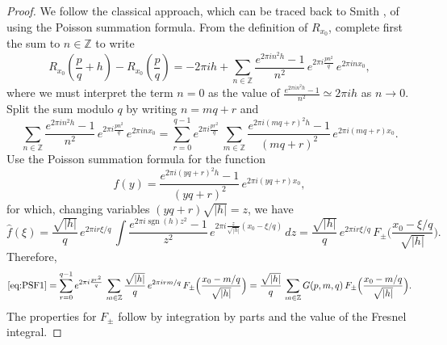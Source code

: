 \documentclass[11pt,reqno]{amsart}
\theoremstyle{definition}
\begin{document}
\begin{proof}
We follow the classical approach, 
which can be traced back to Smith \cite{Smith1972},
of using the Poisson summation formula. 
From the definition of $R_{x_0}$, 
complete first the sum to $n \in \mathbb Z$ to write
\begin{equation}
R_{x_0}\left( \frac{p}{q} + h  \right)  - R_{x_0}\left( \frac{p}{q} \right) 
=  - 2\pi i h +  \sum_{n \in \mathbb Z} \frac{e^{2\pi i n^2 h} - 1}{n^2} \,  e^{2\pi i \frac{pn^2}{q} } \, e^{2\pi i n x_0}, 
\end{equation} 
where we must interpret the term $n=0$ as the value of $\frac{e^{2\pi i n^2 h} - 1}{n^2} \simeq 2\pi i h$ as $n \to 0$. 
Split the sum modulo $q$ by writing $n = mq+r$ and
\begin{equation}\label{eq:PSF1}
\sum_{n \in \mathbb Z} \frac{e^{2\pi i n^2 h} - 1}{n^2} \,  e^{2\pi i \frac{pn^2}{q} } \, e^{2\pi i n x_0}
= \sum_{r=0}^{q-1}  e^{2\pi i \frac{p r^2}{q} } \, \sum_{m \in \mathbb Z} \frac{e^{2\pi i (mq+r)^2 h} - 1}{(mq+r)^2} \, e^{2\pi i ( mq + r) x_0}. 
\end{equation}
Use the Poisson summation formula for the function
\begin{equation}
f(y) = \frac{e^{2\pi i (yq+r)^2 h} - 1}{(yq+r)^2} \, e^{2\pi i (yq + r) x_0}, 
\end{equation}
for which, changing variables $(yq+r) \sqrt{|h|} = z$, we have
\begin{equation}
\widehat{f}(\xi) 
 = \frac{\sqrt{|h|}}{q} \, e^{2\pi i r \xi/q  } \, \int \frac{e^{2\pi i \operatorname{sgn}(h) z^2}-1}{z^2} \, e^{2\pi i \frac{z}{\sqrt{|h|}} (x_0 - \xi/q ) }\, dz 
 =  \frac{\sqrt{|h|}}{q} \, e^{2\pi i r  \xi/q  } \, F_\pm \Big( \frac{x_0 - \xi/q}{\sqrt{|h|}} \Big).
\end{equation}
Therefore, 
\begin{equation}
\eqref{eq:PSF1}  = \sum_{r=0}^{q-1} e^{2\pi i \frac{p r^2}{q} } \, \sum_{m \in \mathbb Z} \frac{\sqrt{|h|}}{q} \, e^{2\pi i r m/q  } \, F_\pm \Big( \frac{x_0 - m/q}{\sqrt{|h|}} \Big) \\
=  \frac{\sqrt{|h|}}{q} \,  \sum_{m \in \mathbb Z} G(p,m,q)  \, F_\pm \Big( \frac{x_0 - m/q}{\sqrt{|h|}} \Big).
\end{equation}
The properties for $F_\pm$ 
follow by integration by parts and the value of the Fresnel integral. 
\end{proof}
\end{document}
